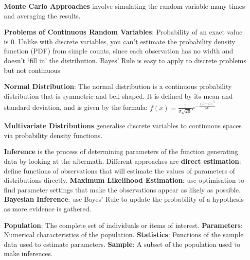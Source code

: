 \documentclass{article}
\begin{document}

\textbf{Monte Carlo Approaches} involve simulating the random variable many times and averaging the results.


\textbf{Problems of Continuous Random Variables}:
Probability of an exact value is 0.
Unlike with discrete variables, you can't estimate the probability density function (PDF) from simple counts,
since each observation has no width and doesn't `fill in' the distribution.
Bayes' Rule is easy to apply to discrete problems but not continuous


\textbf{Normal Distribution}:
The normal distribution is a continuous probability distribution that is symmetric and bell-shaped.
It is defined by its mean and standard deviation, and is given by the formula:
$ f(x) = \frac{1}{\sigma \sqrt{2\pi}} e^{-\frac{(x-\mu)^2}{2\sigma^2}} $



\textbf{Multivariate Distributions} generalise discrete variables to continuous spaces via probability density functions.


\textbf{Inference} is the process of determining parameters of the function generating data by looking at the aftermath.
Different approaches are \textbf{direct estimation}: define functions of observations that will estimate the values of parameters
of distributions directly.
\textbf{Maximum Likelihood Estimation}: use optimisation to find parameter settings that make the observations appear as likely as possible.
\textbf{Bayesian Inference}: use Bayes' Rule to update the probability of a hypothesis as more evidence is gathered.


\textbf{Population}: The complete set of individuals or items of interest.
\textbf{Parameters}: Numerical characteristics of the population.
\textbf{Statistics}: Functions of the sample data used to estimate parameters.
\textbf{Sample}: A subset of the population used to make inferences.

\end{document}
